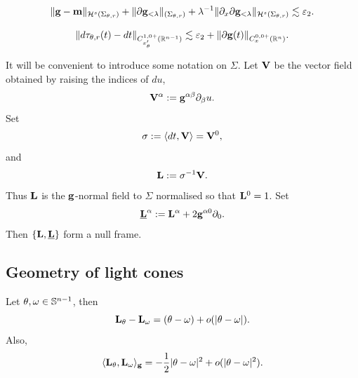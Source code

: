 \begin{proposition}
    
        \begin{equation}
            \|{\bf g} - {\bf m} \|_{\mathcal H^s (\Sigma_{\theta, r})}  + \| \partial {\bf g}_{< \lambda} \|_{(\Sigma_{\theta, r})} + \lambda^{-1} \| \partial_x \partial {\bf g}_{< \lambda} \|_{\mathcal H^s (\Sigma_{\theta, r})}
                \lesssim \varepsilon_2. 
        \end{equation}
\end{proposition}

\begin{proposition}

        \begin{equation}\label{eq:nullregularity}
            \| d \tau_{\theta, r} (t) - dt \|_{C^{1, 0+}_{x'_\theta}(\mathbb R^{n - 1})}
                \lesssim \varepsilon_2 + \| \partial {\bf g} (t) \|_{C^{0, 0+}_x(\mathbb R^n)}.
        \end{equation}
\end{proposition}

It will be convenient to introduce some notation on $\Sigma$. Let ${\bf V}$ be the vector field obtained by raising the indices of $du$, 
    \[
        {\bf V}^\alpha := {\bf g}^{\alpha \beta} \partial_\beta u.
    \]
Set 
    \[
        \sigma := \langle dt, {\bf V} \rangle = {\bf V}^0,
    \]
and 
    \[
        {\bf L} := \sigma^{-1} {\bf V}.
    \]
Thus ${\bf L}$ is the ${\bf g}$-normal field to $\Sigma$ normalised so that ${\bf L}^0 = 1$. Set 
    \[
        \underline{{\bf L}}^\alpha
            := {\bf L}^\alpha + 2 {\bf g}^{\alpha 0} \partial_0.
    \]
Then $\{ {\bf L}, \underline {{\bf L}}\}$ form a null frame. 


\subsection{Geometry of light cones}

\begin{proposition}
    Let $\theta, \omega \in \mathbb S^{n - 1}$, then 
        \begin{equation}\label{eq:differenceL}
            {\bf L}_\theta - {\bf L}_\omega 
                = (\theta - \omega) + o(|\theta - \omega|).
        \end{equation}
    Also, 
        \begin{equation}\label{eq:angleL}
            \langle {\bf L}_\theta, {\bf L}_\omega \rangle_{{\bf g}}
                = -\frac12|\theta - \omega|^2 + o(|\theta - \omega|^2).
        \end{equation}
\end{proposition}

